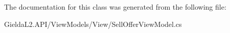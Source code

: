 The documentation for this class was generated from the following file\+:\begin{DoxyCompactItemize}
\item 
Gielda\+L2.\+A\+P\+I/\+View\+Models/\+View/Sell\+Offer\+View\+Model.\+cs\end{DoxyCompactItemize}
